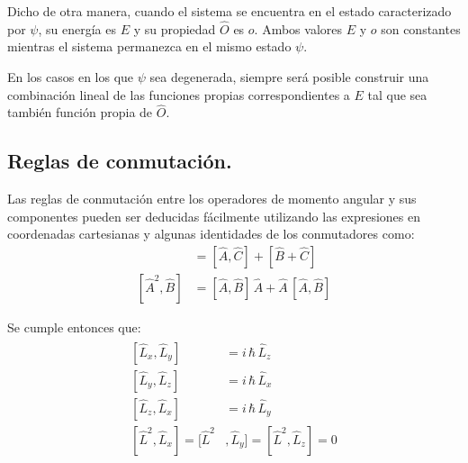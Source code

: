 Dicho de otra manera, cuando el sistema se encuentra en el estado caracterizado por $\psi$, su energía es $E$ y su propiedad $\hat{O}$ es $o$. Ambos valores $E$ y $o$ son constantes mientras el sistema permanezca en el mismo estado $\psi$.
\par
En los casos en los que $\psi$ sea degenerada, siempre será posible construir una combinación lineal de las funciones propias correspondientes a $E$ tal que sea también función propia de $\hat{O}$.

\subsection{Reglas de conmutación.}

Las reglas de conmutación entre los operadores de momento angular y sus componentes pueden ser deducidas fácilmente utilizando las expresiones en coordenadas cartesianas y algunas identidades de los conmutadores como:
\begin{align*}
[ \hat{A} + \hat{B}, \hat{C}] &= [\hat{A}, \hat{C}] + [\hat{B} + \hat{C}] \\[0.5em]
[ \hat{A}^{2} , \hat{B}] &= [\hat{A}, \hat{B}] \, \hat{A} +  \hat{A} \, [\hat{A} , \hat{B}]
\end{align*}

Se cumple entonces que:
\begin{align}
\begin{aligned}
[ \hat{L}_{x}, \hat{L}_{y} ] &= i \, \hbar \, \hat{L}_{z} \\[0.5em]
[ \hat{L}_{y}, \hat{L}_{z} ] &= i \, \hbar \, \hat{L}_{x} \\[0.5em]
[ \hat{L}_{z}, \hat{L}_{x} ] &= i \, \hbar \, \hat{L}_{y} \\[0.5em]
[\hat{L}^{2}, \hat{L}_{x}] = [\hat{L}^{2}&, \hat{L}_{y}] = [\hat{L}^{2}, \hat{L}_{z}] = 0
\end{aligned}
\label{eq:ecuacion_01_07}
\end{align}

